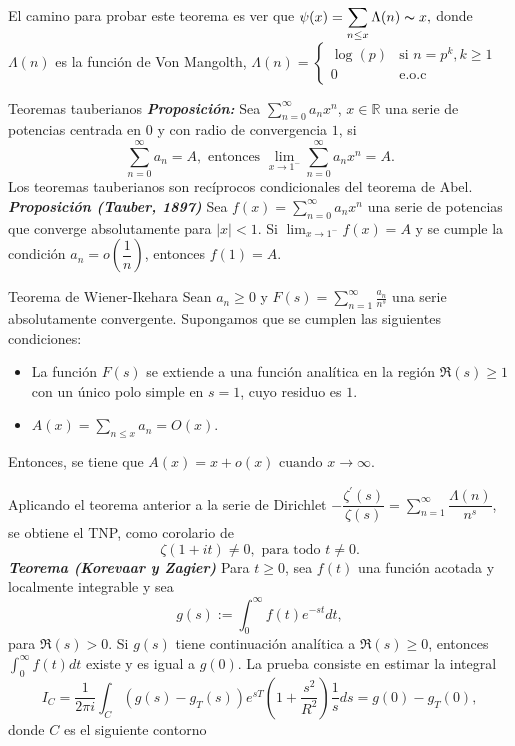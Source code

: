 \documentclass[final]{beamer}
\newcommand\R{\ensuremath{\mathbb{R}}}
\newlength{\colwidth}
\newcommand{\defi}[1]{\textbf{\textsl{#1}}}
\begin{document}
\begin{frame}[t,fragile]
\begin{columns}[t]
\begin{column}{\colwidth}
\phantom{xd}\\\vspace*{0.6cm}
El camino para probar este teorema es ver que $\displaystyle\psi(x)=\sum_{n\leq x} \Lambda(n)\thicksim x,$ donde $\Lambda(n)$ es la función de Von Mangolth, $\displaystyle\Lambda(n)=\begin{cases}
    \log(p) &\text{si } n=p^k, k\geq 1\\
    0 &\text{e.o.c}
\end{cases}$
\begin{block}{Teoremas tauberianos}
\defi{Proposición: }Sea $\displaystyle \sum_{n=0}^{\infty} a_n x^n$, $x\in \R$ una serie de potencias centrada en $0$ y con radio  de convergencia $1$, si
$$\sum_{n=0}^{\infty} a_n=A,\text{ entonces } \lim_{x \to 1^-}\sum_{n=0}^{\infty} a_n x^n=A.$$
Los teoremas tauberianos son recíprocos condicionales del teorema de Abel.\\
\defi{Proposición (Tauber, 1897)} Sea $f(x)=\displaystyle\sum_{n=0}^{\infty} a_n x^n$ una serie de potencias que converge absolutamente para $|x|<1$.
Si $\lim_{x \rightarrow 1^{-}} f(x)=A$ y se cumple la condición $a_n=o\left(\dfrac{1}{n}\right)$, entonces $f(1)=A$.
\end{block}
\begin{exampleblock}{Teorema de Wiener-Ikehara}
Sean $a_n \geq 0$ y $F(s)=\displaystyle\sum_{n=1}^{\infty} \frac{a_n}{n^s}$ una serie absolutamente convergente. Supongamos que se cumplen las siguientes condiciones:
\begin{itemize}
\item La función $F(s)$ se extiende a una función analítica en la región $\Re(s) \geq 1$ con un único polo simple en $s=1$, cuyo residuo es $1$.\\
\item $A(x)=\displaystyle \sum_{n \leq x} a_n=O(x)$.
\end{itemize}
Entonces, se tiene que $A(x)=x+o(x) \text { cuando } x \rightarrow \infty \text {. }
$
\end{exampleblock}
Aplicando el teorema anterior a la serie de Dirichlet $\displaystyle-\dfrac{\zeta^{\prime}(s)}{\zeta(s)}=\sum_{n=1}^{\infty}\dfrac{\Lambda(n)}{n^s}$, se obtiene el TNP, como corolario de
$$\zeta(1+it)\neq 0, \text{ para todo } t\neq 0.$$
\defi{Teorema (Korevaar y Zagier)} Para $t \geq 0$, sea $f(t)$ una función acotada y localmente integrable y sea $$g(s):=\displaystyle\int_0^{\infty} f(t) e^{-s t} d t,$$
para $\Re(s)>0$. Si $g(s)$ tiene continuación analítica a $\Re(s) \geq 0$, entonces $\displaystyle\int_0^{\infty} f(t) d t$ existe y es igual a $g(0)$.
La prueba consiste en estimar la integral
$$I_{C}=\frac{1}{2\pi i}\int_{C}\left(g(s)-g_T(s)\right)e^{sT}\left(1+\frac{s^2}{R^2}\right)\frac{1}{s}ds=g(0)-g_T(0),$$
donde $C$ es el siguiente contorno
\begin{center}


\end{center}
\end{column}
\end{columns}
\end{frame}
\end{document}
